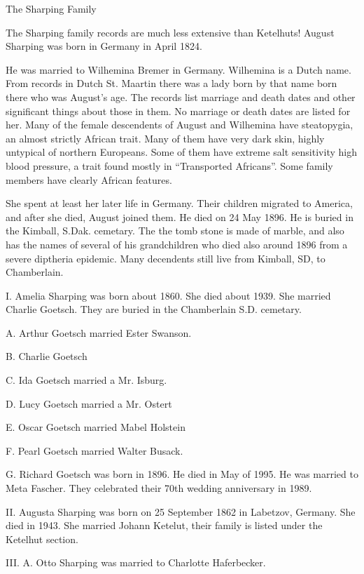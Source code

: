 \documentclass[a4paper]{article}
\begin{document}
\pagebreak

{\Huge \noindent The Sharping Family}
\vskip 5mm


The Sharping family records are much less extensive than Ketelhuts!  August Sharping was born in Germany in April 1824.  

He was married to Wilhemina Bremer in Germany.  Wilhemina is a Dutch name.  From records in Dutch St. Maartin there was a lady born by that name born there who was August's age.  The records list marriage and death dates and other significant things about those in them.  No marriage or death dates are listed for her.  Many of the female descendents of August and Wilhemina have steatopygia, an almost strictly African trait. Many of them have very dark skin, highly untypical of northern Europeans.  Some of them have extreme salt sensitivity high blood pressure, a trait found mostly in ``Transported Africans''.  Some family members have clearly African features.  

She spent at least  her later life in Germany.  Their children migrated to America, and after she died, August joined them.  He died on 24 May 1896.  He is buried in the Kimball, S.Dak. cemetary.  The the tomb stone is made of marble, and also has the names of several of his grandchildren who died also around 1896 from a severe diptheria epidemic.  Many decendents still live from Kimball, SD, to Chamberlain.

I. Amelia Sharping was born about 1860.  She died about 1939.  She married  Charlie Goetsch.  They are buried in the Chamberlain S.D. cemetary.  

A. Arthur Goetsch married Ester Swanson.

B. Charlie Goetsch

C. Ida Goetsch married a Mr. Isburg.

D. Lucy Goetsch married a Mr. Ostert

E. Oscar Goetsch married  Mabel Holstein

F. Pearl Goetsch married Walter Busack.

G. Richard Goetsch was born in 1896.  He died in May of 1995.  He was married to Meta Fascher.  They celebrated their 70th wedding anniversary in 1989. 

II. Augusta Sharping was born on 25 September 1862 in Labetzov, Germany.  She died in 1943.  She married Johann Ketelut, their family is listed under the Ketelhut section.

III. A. Otto  Sharping was married to Charlotte Haferbecker.
\end{document}
